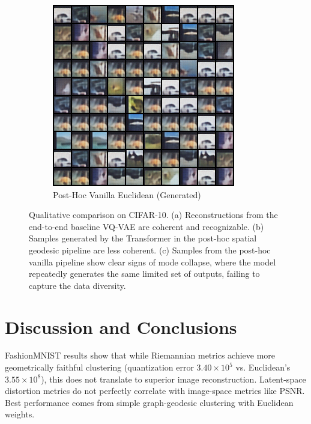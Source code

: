 \documentclass{article}
\begin{document}
\begin{figure}[!p]
\begin{subfigure}[b]{0.32\textwidth}
        \includegraphics[width=\linewidth]{images/cifar10_vanilla_euclidean_generated_samples.png}
        \caption{Post-Hoc Vanilla Euclidean (Generated)}
        \label{fig:cifar_vanilla}
    \end{subfigure}
    \caption{Qualitative comparison on CIFAR-10. (a) Reconstructions from the end-to-end baseline VQ-VAE are coherent and recognizable. (b) Samples generated by the Transformer in the post-hoc spatial geodesic pipeline are less coherent. (c) Samples from the post-hoc vanilla pipeline show clear signs of mode collapse, where the model repeatedly generates the same limited set of outputs, failing to capture the data diversity.}
    \label{fig:cifar_recon}
\end{figure}

\section{Discussion and Conclusions}
FashionMNIST results show that while Riemannian metrics achieve more geometrically faithful clustering (quantization error $3.40 \times 10^5$ vs. Euclidean's $3.55 \times 10^8$), this does not translate to superior image reconstruction. Latent-space distortion metrics do not perfectly correlate with image-space metrics like PSNR. Best performance comes from simple graph-geodesic clustering with Euclidean weights.
\end{document}
